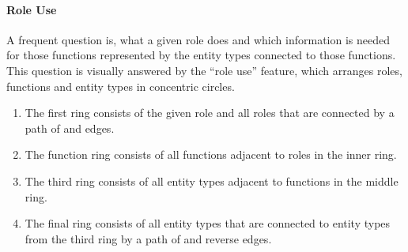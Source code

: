 \documentclass{IOS-Book-Article}     %
\begin{document}
\paragraph{Role Use}


A frequent question is, what a given role does and which information is needed for those functions represented by the entity types connected to those functions.
This question is visually answered by the \enquote{role use} feature, which arranges roles, functions and entity types in concentric circles.%

\begin{enumerate}%
\item The first ring consists of the given role and all roles that are connected by a path of  and  edges.
\item The function ring consists of all functions adjacent to roles in the inner ring.
\item The third ring consists of all entity types adjacent to functions in the middle ring.
\item The final ring consists of all entity types that are connected to entity types from the third ring by a path of  and reverse  edges.
\end{enumerate}
\end{document}
